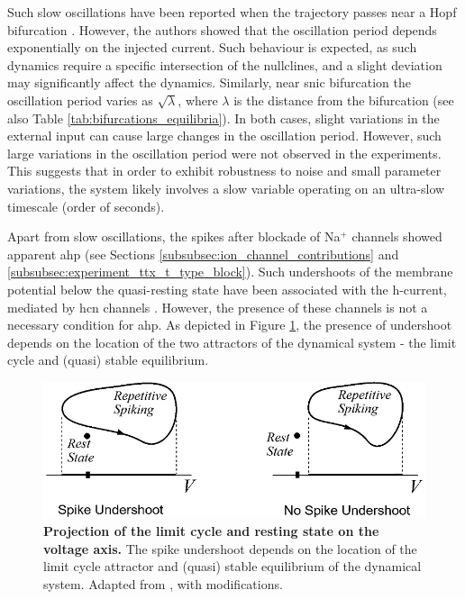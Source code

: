 \documentclass[../main.tex]{subfiles}
\begin{document}
Such slow oscillations have been reported when the trajectory passes near a Hopf bifurcation \parencite{doiGenerationVerySlow2005}. However, the authors showed that the oscillation period depends exponentially on the injected current. Such behaviour is expected, as such dynamics require a specific intersection of the nullclines, and a slight deviation may significantly affect the dynamics. Similarly, near \gls{snic} bifurcation the oscillation period varies as $\sqrt{\lambda}$, where $\lambda$ is the distance from the bifurcation \parencite{strogatzNonlinearDynamicsChaos2018,izhikevichNEURALEXCITABILITYSPIKING2000} (see also Table \ref{tab:bifurcations_equilibria}). In both cases, slight variations in the external input can cause large changes in the oscillation period. However, such large variations in the oscillation period were not observed in the experiments. This suggests that in order to exhibit robustness to noise and small parameter variations, the system likely involves a slow variable operating on an ultra-slow timescale (order of seconds).

Apart from slow oscillations, the spikes after blockade of Na$^+$ channels showed apparent \gls{ahp} (see Sections \ref{subsubsec:ion_channel_contributions} and \ref{subsubsec:experiment_ttx_t_type_block}). Such undershoots of the membrane potential below the quasi-resting state have been associated with the h-current, mediated by \gls{hcn} channels \parencite{oswaldIHCurrentGenerates2009,boninHyperpolarizationActivatedCurrentIh2013}. However, the presence of these channels is not a necessary condition for \gls{ahp}. As depicted in Figure \ref{fig:potential_undershoot_izhikevich}, the presence of undershoot depends on the location of the two attractors of the dynamical system - the limit cycle and (quasi) stable equilibrium.

\begin{figure}[!t]
    \centering
    \includegraphics[width=0.85\linewidth]{../img/2_mathematical_overview/spike_undershoot_bw.png}
    \caption[Projection of the limit cycle and resting state on the voltage axis.]{
        \textbf{Projection of the limit cycle and resting state on the voltage axis.} 
        The spike undershoot depends on the location of the limit cycle attractor and (quasi) stable equilibrium of the dynamical system.
        Adapted from \parencite{izhikevichNEURALEXCITABILITYSPIKING2000}, with modifications.
    }
    \label{fig:potential_undershoot_izhikevich}
\end{figure}
\end{document}
